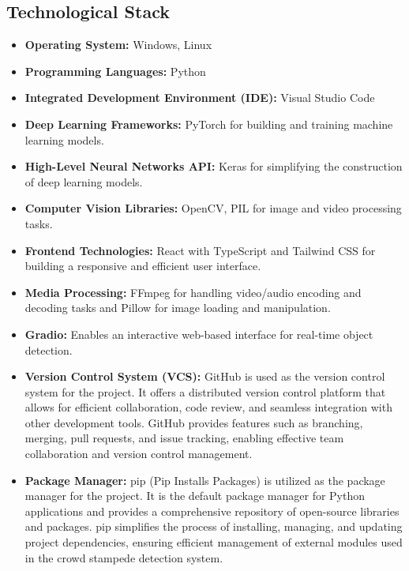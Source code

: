 \documentclass[11pt]{report}
\begin{document}
\subsection{Technological Stack}
\begin{itemize}
    \item \textbf{Operating System:} Windows, Linux
    \item \textbf{Programming Languages:} Python
    \item \textbf{Integrated Development Environment (IDE):} Visual Studio Code
    \item \textbf{Deep Learning Frameworks:} PyTorch for building and training machine learning models.
    \item \textbf{High-Level Neural Networks API:} Keras for simplifying the construction of deep learning models.
    \item \textbf{Computer Vision Libraries:} OpenCV, PIL for image and video processing tasks.
    \item \textbf{Frontend Technologies:} React with TypeScript and Tailwind CSS for building a responsive and efficient user interface.
    \item \textbf{Media Processing:} FFmpeg for handling video/audio encoding and decoding tasks and Pillow for image loading and manipulation.
    \item \textbf{Gradio:} Enables an interactive web-based interface for real-time object detection.
\end{itemize}

    \begin{itemize}

        \item \textbf{Version Control System (VCS):} GitHub is used as the version control system for the project. It offers a distributed version control platform that allows for efficient collaboration, code review, and seamless integration with other development tools. GitHub provides features such as branching, merging, pull requests, and issue tracking, enabling effective team collaboration and version control management.
        
        \item \textbf{Package Manager:} pip (Pip Installs Packages) is utilized as the package manager for the project. It is the default package manager for Python applications and provides a comprehensive repository of open-source libraries and packages. pip simplifies the process of installing, managing, and updating project dependencies, ensuring efficient management of external modules used in the crowd stampede detection system.

        \end{itemize}
\end{document}
